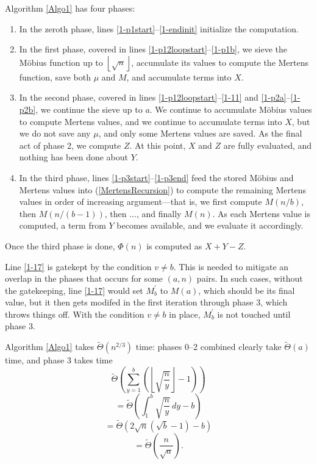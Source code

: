 \documentclass[12pt]{article}
\newcommand{\eqn}[1]{\begin{displaymath} #1 \end{displaymath}}
\newcommand{\floor}[1]{{\left\lfloor #1 \right\rfloor}}
\newcommand{\integral}[4]{\displaystyle\int_{#3}^{#4} \! #1 \, d#2}
\newcommand{\eval}[3]{\left. #1 \right|_{#2}^{#3}}
\newcommand{\isqrt}[1]{\floor{\sqrt{#1}}}
\newcommand{\softTheta}[0]{\widetilde{\Theta}}
\begin{document}
Algorithm \ref{Algo1} has four phases:
\begin{enumerate} \addtocounter{enumi}{-1}
\item In the zeroth phase, lines \ref{1-p1start}--\ref{1-endinit} initialize the computation.
\item In the first phase, covered in lines \ref{1-p12loopstart}--\ref{1-p1b}, we sieve the M\"{o}bius function up to $\isqrt{n}$, accumulate its values to compute the Mertens function, save both $\mu$ and $M$, and accumulate terms into $X$.
\item In the second phase, covered in lines \ref{1-p12loopstart}--\ref{1-11} and \ref{1-p2a}--\ref{1-p2b}, we continue the sieve up to $a$.  We continue to accumulate M\"{o}bius values to compute Mertens values, and we continue to accumulate terms into $X$, but we do not save any $\mu$, and only some Mertens values are saved.  As the final act of phase 2, we compute $Z$.  At this point, $X$ and $Z$ are fully evaluated, and nothing has been done about $Y$.
\item In the third phase, lines \ref{1-p3start}--\ref{1-p3end} feed the stored M\"{o}bius and Mertens values into (\ref{MertensRecursion}) to compute the remaining Mertens values in order of increasing argument---that is, we first compute $M(n/b)$, then $M(n/(b-1))$, then ..., and finally $M(n)$.  As each Mertens value is computed, a term from $Y$ becomes available, and we evaluate it accordingly.
\end{enumerate}
Once the third phase is done, $\Phi(n)$ is computed as $X+Y-Z$.

Line \ref{1-17} is gatekept by the condition $v \neq b$.  This is needed to mitigate an overlap in the phases that occurs for some $(a,n)$ pairs.  In such cases, without the gatekeeping, line \ref{1-17} would set $M^\prime_b$ to $M(a)$, which should be its final value, but it then gets modifed in the first iteration through phase 3, which throws things off.  With the condition $v \neq b$ in place, $M^\prime_b$ is not touched until phase 3.

Algorithm \ref{Algo1} takes $\softTheta(n^{2/3})$ time: phases 0--2 combined clearly take $\softTheta(a)$ time, and phase 3 takes time
\eqn{\softTheta \left( \sum_{y=1}^b \left( \isqrt{\frac{n}{y}} - 1 \right) \right)}
\eqn{= \softTheta \left( \integral{ \sqrt{\frac{n}{y}} }{y}{1}{b} - b \right)}
\eqn{= \softTheta \left( 2 \sqrt{n} \left( \sqrt{b} - 1 \right) - b \right)}
\eqn{= \softTheta \left( \frac{n}{\sqrt{a}} \right).}
\end{document}
